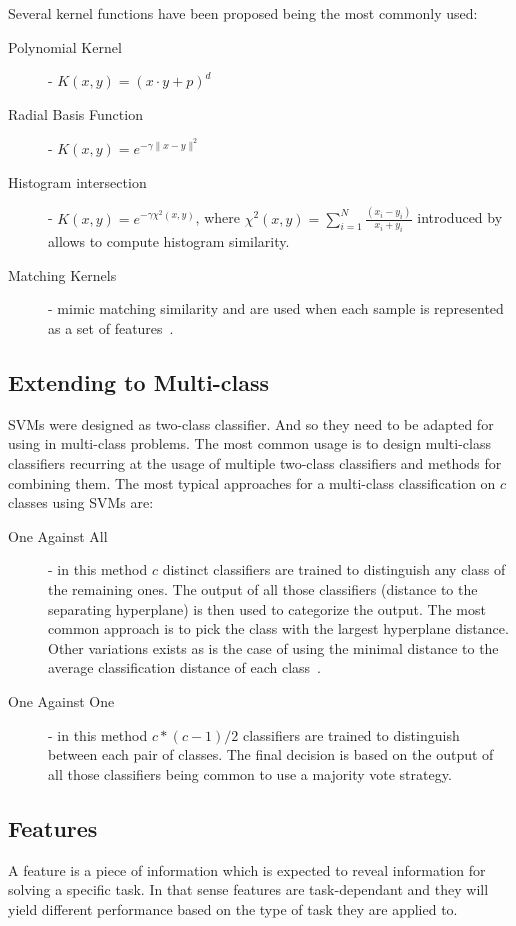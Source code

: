 Several kernel functions have been proposed being the most commonly used:

\begin{description}
\item[Polynomial Kernel] - $K(x, y) = (x \cdot y + p)^d$
\item[Radial Basis Function] - $K(x, y) = e^{-\gamma\|x - y \|^2}$
\item[Histogram intersection] - $K(x, y) = e^{-\gamma \chi^2(x,y)}$, where $\chi^2(x,y) = \sum_{i=1}^{N}\frac{(x_i-y_i)}{x_i+y_i}$ introduced by \cite{barla2003histogram} allows to compute histogram similarity.
\item[Matching Kernels] - mimic matching similarity and are used when each sample is represented as a set of features~\citep{boughorbel2005intermediate}.
\end{description}

\subsection{Extending to Multi-class}
\label{sec:multiclass-classifiers}
\Glspl{SVM} were designed as two-class classifier. And so they need to be adapted for using in multi-class problems.
The most common usage is to design multi-class classifiers recurring at the usage of multiple two-class classifiers and methods for combining them.
The most typical approaches for a multi-class classification on $c$ classes using \glspl{SVM} are:

\begin{description}
\item[One Against All] - in this method $c$ distinct classifiers are trained to distinguish any class of the remaining ones.
The output of all those classifiers (distance to the separating hyperplane) is then used to categorize the output.
The most common approach is to pick the class with the largest hyperplane distance.
Other variations exists as is the case of using the minimal distance to the average classification distance of each class~\citep{pronobis2007confidence}.

\item[One Against One] - in this method $c*(c-1)/2$ classifiers are trained to distinguish between each pair of classes. The final decision is based on the output of all those classifiers being common to use a majority vote strategy.
\end{description}


\subsection{Features}\label{sec:features}
A feature is a piece of information which is expected to reveal information for solving a specific task.
In that sense features are task-dependant and they will yield different performance based on the type of task they are applied to.

